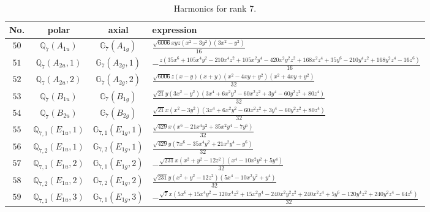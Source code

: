 \documentclass[fleqn,8pt,landscape]{jsarticle}
\begin{document}
\begin{table}[ht!]
\begin{center}
\caption{Harmonics for rank 7.}
\renewcommand{\arraystretch}{1.3}
\begin{tabular}{cccl} \hline \hline
No. & polar & axial & expression \\ \hline
$ 50 $ & $ \mathbb{Q}_{7}(A_{1u}) $ & $ \mathbb{G}_{7}(A_{1g}) $ & $ \frac{\sqrt{6006} x y z \left(x^{2} - 3 y^{2}\right) \left(3 x^{2} - y^{2}\right)}{16} $ \\
$ 51 $ & $ \mathbb{Q}_{7}(A_{2u},1) $ & $ \mathbb{G}_{7}(A_{2g},1) $ & $ - \frac{z \left(35 x^{6} + 105 x^{4} y^{2} - 210 x^{4} z^{2} + 105 x^{2} y^{4} - 420 x^{2} y^{2} z^{2} + 168 x^{2} z^{4} + 35 y^{6} - 210 y^{4} z^{2} + 168 y^{2} z^{4} - 16 z^{6}\right)}{16} $ \\
$ 52 $ & $ \mathbb{Q}_{7}(A_{2u},2) $ & $ \mathbb{G}_{7}(A_{2g},2) $ & $ \frac{\sqrt{6006} z \left(x - y\right) \left(x + y\right) \left(x^{2} - 4 x y + y^{2}\right) \left(x^{2} + 4 x y + y^{2}\right)}{32} $ \\
$ 53 $ & $ \mathbb{Q}_{7}(B_{1u}) $ & $ \mathbb{G}_{7}(B_{1g}) $ & $ \frac{\sqrt{21} y \left(3 x^{2} - y^{2}\right) \left(3 x^{4} + 6 x^{2} y^{2} - 60 x^{2} z^{2} + 3 y^{4} - 60 y^{2} z^{2} + 80 z^{4}\right)}{32} $ \\
$ 54 $ & $ \mathbb{Q}_{7}(B_{2u}) $ & $ \mathbb{G}_{7}(B_{2g}) $ & $ \frac{\sqrt{21} x \left(x^{2} - 3 y^{2}\right) \left(3 x^{4} + 6 x^{2} y^{2} - 60 x^{2} z^{2} + 3 y^{4} - 60 y^{2} z^{2} + 80 z^{4}\right)}{32} $ \\
$ 55 $ & $ \mathbb{Q}_{7,1}(E_{1u},1) $ & $ \mathbb{G}_{7,1}(E_{1g},1) $ & $ \frac{\sqrt{429} x \left(x^{6} - 21 x^{4} y^{2} + 35 x^{2} y^{4} - 7 y^{6}\right)}{32} $ \\
$ 56 $ & $ \mathbb{Q}_{7,2}(E_{1u},1) $ & $ \mathbb{G}_{7,2}(E_{1g},1) $ & $ \frac{\sqrt{429} y \left(7 x^{6} - 35 x^{4} y^{2} + 21 x^{2} y^{4} - y^{6}\right)}{32} $ \\
$ 57 $ & $ \mathbb{Q}_{7,1}(E_{1u},2) $ & $ \mathbb{G}_{7,1}(E_{1g},2) $ & $ - \frac{\sqrt{231} x \left(x^{2} + y^{2} - 12 z^{2}\right) \left(x^{4} - 10 x^{2} y^{2} + 5 y^{4}\right)}{32} $ \\
$ 58 $ & $ \mathbb{Q}_{7,2}(E_{1u},2) $ & $ \mathbb{G}_{7,2}(E_{1g},2) $ & $ \frac{\sqrt{231} y \left(x^{2} + y^{2} - 12 z^{2}\right) \left(5 x^{4} - 10 x^{2} y^{2} + y^{4}\right)}{32} $ \\
$ 59 $ & $ \mathbb{Q}_{7,1}(E_{1u},3) $ & $ \mathbb{G}_{7,1}(E_{1g},3) $ & $ - \frac{\sqrt{7} x \left(5 x^{6} + 15 x^{4} y^{2} - 120 x^{4} z^{2} + 15 x^{2} y^{4} - 240 x^{2} y^{2} z^{2} + 240 x^{2} z^{4} + 5 y^{6} - 120 y^{4} z^{2} + 240 y^{2} z^{4} - 64 z^{6}\right)}{32} $ \\

\end{tabular}
\end{center}
\end{table}
\end{document}
